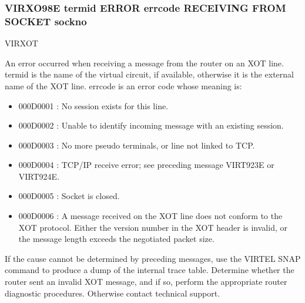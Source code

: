 \documentclass[letterpaper,10pt,english]{sphinxmanual}
\begin{document}
\subsubsection{VIRXO98E termid ERROR errcode RECEIVING FROM SOCKET sockno}
\label{\detokenize{messages:virxo98e-termid-error-errcode-receiving-from-socket-sockno}}\begin{description}
\sphinxAtStartPar
VIRXOT

\sphinxAtStartPar
An error occurred when receiving a message from the router on an XOT line. termid is the name of the virtual circuit, if available, otherwise it is the external name of the XOT line. errcode is an error code whose meaning is:
\begin{itemize}
\item {} 
\sphinxAtStartPar
000D0001 : No session exists for this line.

\item {} 
\sphinxAtStartPar
000D0002 : Unable to identify incoming message with an existing session.

\item {} 
\sphinxAtStartPar
000D0003 : No more pseudo terminals, or line not linked to TCP.

\item {} 
\sphinxAtStartPar
000D0004 : TCP/IP receive error; see preceding message VIRT923E or VIRT924E.

\item {} 
\sphinxAtStartPar
000D0005 : Socket is closed.

\item {} 
\sphinxAtStartPar
000D0006 : A message received on the XOT line does not conform to the XOT protocol. Either the version number in the XOT header is invalid, or the message length exceeds the negotiated packet size.

\end{itemize}

\sphinxAtStartPar
If the cause cannot be determined by preceding messages, use the VIRTEL SNAP command to produce a dump of the internal trace table. Determine whether the router sent an invalid XOT message, and if so, perform the appropriate router diagnostic procedures. Otherwise contact technical support.

\end{description}
\end{document}
